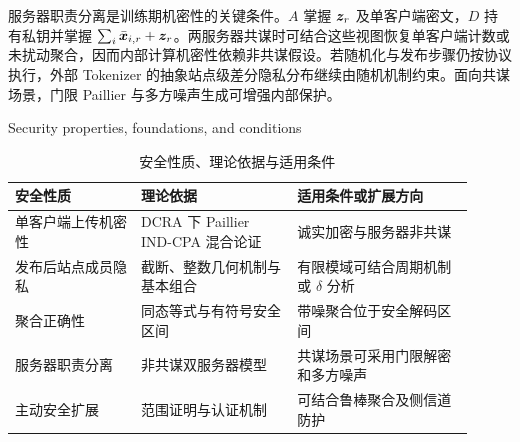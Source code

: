 服务器职责分离是训练期机密性的关键条件。$A$ 掌握 $\bm{z}_r$ 及单客户端密文，$D$ 持有私钥并掌握 $\sum_i\bar{\bm{x}}_{i,r}+\bm{z}_r$。两服务器共谋时可结合这些视图恢复单客户端计数或未扰动聚合，因而内部计算机密性依赖非共谋假设。若随机化与发布步骤仍按协议执行，外部 Tokenizer 的抽象站点级差分隐私分布继续由随机机制约束。面向共谋场景，门限 Paillier 与多方噪声生成可增强内部保护。

\begin{table}
\centering
\caption{安全性质、理论依据与适用条件}{Security properties, foundations, and conditions}
\begin{tabular}{p{0.25\linewidth}p{0.31\linewidth}p{0.35\linewidth}}
\toprule
安全性质 & 理论依据 & 适用条件或扩展方向 \\
\midrule
单客户端上传机密性 & DCRA 下 Paillier IND-CPA 混合论证 & 诚实加密与服务器非共谋 \\
发布后站点成员隐私 & 截断、整数几何机制与基本组合 & 有限模域可结合周期机制或 $\delta$ 分析 \\
聚合正确性 & 同态等式与有符号安全区间 & 带噪聚合位于安全解码区间 \\
服务器职责分离 & 非共谋双服务器模型 & 共谋场景可采用门限解密和多方噪声 \\
主动安全扩展 & 范围证明与认证机制 & 可结合鲁棒聚合及侧信道防护 \\
\bottomrule
\end{tabular}
\end{table}
